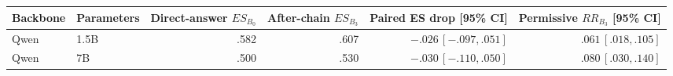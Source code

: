 \documentclass[letterpaper]{article} %
\begin{document}
\begin{table}[t]
\centering
\small
\begin{tabular}{llrrrr}
\toprule
Backbone & Parameters & Direct-answer \(ES_{B_0}\) & After-chain \(ES_{B_3}\) & Paired ES drop [95\% CI] & Permissive \(RR_{B_3}\) [95\% CI] \\ %
\midrule
Qwen  & 1.5B & .582 & .607 & $-.026\,[-.097,.051]$ & $.061\,[.018,.105]$ \\ %
Qwen  & 7B   & .500 & .530 & $-.030\,[-.110,.050]$ & $.080\,[.030,.140]$ \\ %

\end{tabular}
\end{table}
\end{document}
